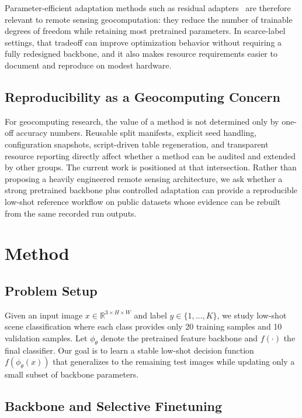 \documentclass[a4paper,fleqn]{cas-sc}
\begin{document}
Parameter-efficient adaptation methods such as residual adapters~\cite{houlsby2019adapter} are therefore relevant to remote sensing geocomputation: they reduce the number of trainable degrees of freedom while retaining most pretrained parameters. In scarce-label settings, that tradeoff can improve optimization behavior without requiring a fully redesigned backbone, and it also makes resource requirements easier to document and reproduce on modest hardware.

\subsection{Reproducibility as a Geocomputing Concern}

For geocomputing research, the value of a method is not determined only by one-off accuracy numbers. Reusable split manifests, explicit seed handling, configuration snapshots, script-driven table regeneration, and transparent resource reporting directly affect whether a method can be audited and extended by other groups. The current work is positioned at that intersection. Rather than proposing a heavily engineered remote sensing architecture, we ask whether a strong pretrained backbone plus controlled adaptation can provide a reproducible low-shot reference workflow on public datasets whose evidence can be rebuilt from the same recorded run outputs.

\section{Method}
\label{sec:method}

\subsection{Problem Setup}

Given an input image $x \in \mathbb{R}^{3 \times H \times W}$ and label $y \in \{1, \dots, K\}$, we study low-shot scene classification where each class provides only 20 training samples and 10 validation samples. Let $\phi_{\theta}$ denote the pretrained feature backbone and $f(\cdot)$ the final classifier. Our goal is to learn a stable low-shot decision function $f(\phi_{\theta}(x))$ that generalizes to the remaining test images while updating only a small subset of backbone parameters.

\subsection{Backbone and Selective Finetuning}
\end{document}
